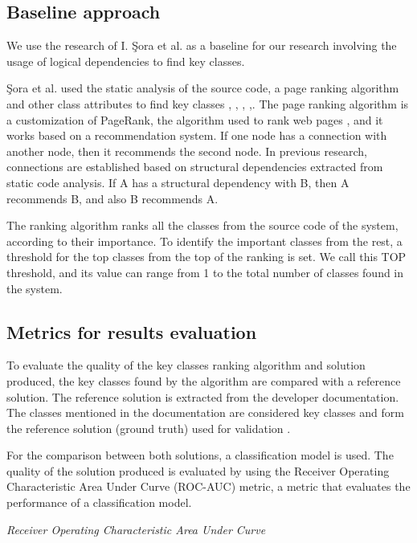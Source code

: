 \documentclass[runningheads]{comsis2}
\begin{document}
\subsection{Baseline approach}
\label{sec:baseline_approach_sub}
We use the research of I. Şora et al. \cite{Finding-key-classes} as a baseline for our research involving the usage of logical dependencies to find key classes. 

Şora et al. used the static analysis of the source code, a page ranking algorithm and other class attributes to find key classes \cite{PagerankENASE}, \cite{enase15}, \cite{SoraSpringer}, \cite{PagerankSACI},\cite{Finding-key-classes}.
The page ranking algorithm is a customization of PageRank, the algorithm used to rank web pages \cite{ilprints422}, and it works based on a recommendation system. If one node has a connection with another node, then it recommends the second node. In previous research, connections are established based on structural dependencies extracted from static code analysis. If A has a structural dependency with B, then A recommends B, and also B recommends A.

The ranking algorithm ranks all the classes from the source code of the system, according to their importance. To identify the important classes from the rest, a threshold for the top classes from the top of the ranking is set. We call this TOP threshold, and its value can range from 1 to the total number of classes found in the system. 

\subsection{Metrics for results evaluation}
\label{sec:evalmetrics}
To evaluate the quality of the key classes ranking algorithm and solution produced, the key classes found by the algorithm are compared with a reference solution. The reference solution is extracted from the developer documentation. The classes mentioned in the documentation are considered key classes and form the reference solution (ground truth) used for validation \cite{7551990}.

For the comparison between both solutions, a classification model is used. The quality of the solution produced is evaluated by using the Receiver Operating Characteristic Area Under Curve (ROC-AUC) metric, a metric that evaluates the performance of a classification model.


\textit{Receiver Operating Characteristic Area Under Curve}
\end{document}
